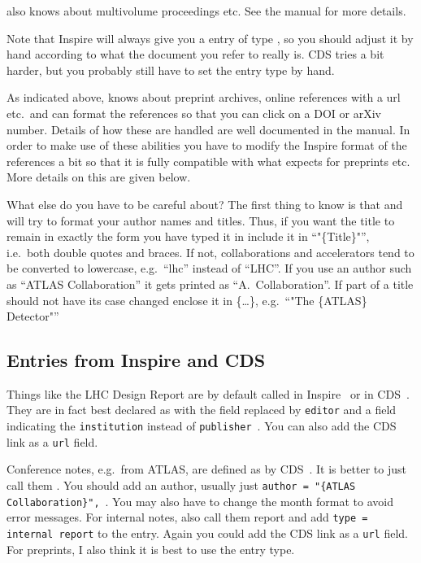  also knows about multivolume proceedings etc. See
the manual for more details.

Note that Inspire will always give you a \BibTeX{} entry of type
, so you should adjust it by hand according to what
the document you refer to really is. CDS tries a bit harder, but you
probably still have to set the entry type by hand.

As indicated above,  knows about preprint archives,
online references with a url etc.\ and can format the references so
that you can click on a DOI or arXiv number. Details of how these are
handled are well documented in the manual.  In order to make use of
these abilities you have to modify the Inspire format of the references
a bit so that it is fully compatible with what 
expects for preprints etc. More details on this are given below.

What else do you have to be careful about? The first thing to know is
that  and \BibTeX{} will try to format your author
names and titles. Thus, if you want the title to remain in exactly the
form you have typed it in include it in \enquote{"\{Title\}"}, %
i.e.\ both double quotes and braces. If not, collaborations and accelerators
tend to be converted to lowercase, e.g.\ \enquote{lhc} instead of
\enquote{LHC}. If you use an author such as ``ATLAS Collaboration'' it
gets printed as \enquote{A.\ Collaboration}.
If part of a title should not have its case changed enclose it in \{\ldots\},
e.g.\ \enquote{"The \{ATLAS\} Detector"} %


\subsection{Entries from Inspire and CDS}%
%
\label{sec:ref:cds}

Things like the LHC Design Report are by default
called  in Inspire~\cite{Bruning:2004ej-inspire} or
 in CDS~\cite{Bruening:782076-CDS}. They are in fact
best declared as  with the  field
replaced by \texttt{editor} and a field indicating the
\texttt{institution} instead of
\texttt{publisher}~\cite{lhc:vol1-final}. You can also add the CDS
link as a \texttt{url} field.

Conference notes, e.g.\ from ATLAS, are defined
as  by CDS~\cite{ATLAS-CONF-2011-008-CDS}. It is
better to just call them . You should add an author,
usually just
\texttt{author = "\{ATLAS Collaboration\}",}~\cite{ATLAS-CONF-2011-008-final}. %
You may also have to change the month format to avoid error messages.
For internal notes, also call them report and add \texttt{type = {internal report}}
to the entry. Again you could add the CDS link as a \texttt{url}
field. For preprints, I also think it is best to use
the  entry type.

